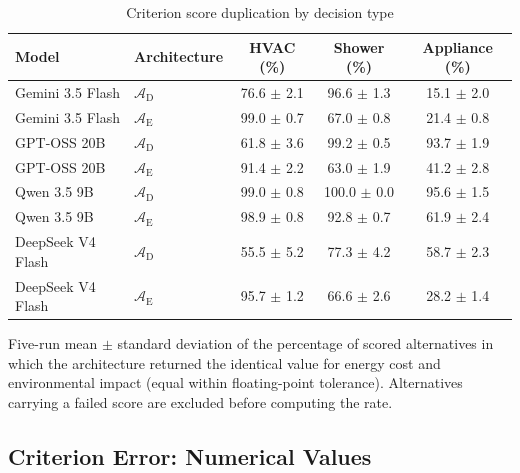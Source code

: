 \documentclass[11pt]{article}
\begin{document}
\begin{table}[htbp]
\centering
\begin{threeparttable}
  \centering
  \footnotesize
  \begin{tabular}{llccc}
    \toprule
    Model & Architecture & HVAC (\%) & Shower (\%) & Appliance (\%) \\
    \midrule
    Gemini 3.5 Flash & $\mathcal{A}_{\text{D}}$ & 76.6 $\pm$ 2.1 & 96.6 $\pm$ 1.3 & 15.1 $\pm$ 2.0 \\
    \addlinespace
    Gemini 3.5 Flash & $\mathcal{A}_{\text{E}}$ & 99.0 $\pm$ 0.7 & 67.0 $\pm$ 0.8 & 21.4 $\pm$ 0.8 \\
    GPT-OSS 20B & $\mathcal{A}_{\text{D}}$ & 61.8 $\pm$ 3.6 & 99.2 $\pm$ 0.5 & 93.7 $\pm$ 1.9 \\
    \addlinespace
    GPT-OSS 20B & $\mathcal{A}_{\text{E}}$ & 91.4 $\pm$ 2.2 & 63.0 $\pm$ 1.9 & 41.2 $\pm$ 2.8 \\
    Qwen 3.5 9B & $\mathcal{A}_{\text{D}}$ & 99.0 $\pm$ 0.8 & 100.0 $\pm$ 0.0 & 95.6 $\pm$ 1.5 \\
    \addlinespace
    Qwen 3.5 9B & $\mathcal{A}_{\text{E}}$ & 98.9 $\pm$ 0.8 & 92.8 $\pm$ 0.7 & 61.9 $\pm$ 2.4 \\
    DeepSeek V4 Flash & $\mathcal{A}_{\text{D}}$ & 55.5 $\pm$ 5.2 & 77.3 $\pm$ 4.2 & 58.7 $\pm$ 2.3 \\
    \addlinespace
    DeepSeek V4 Flash & $\mathcal{A}_{\text{E}}$ & 95.7 $\pm$ 1.2 & 66.6 $\pm$ 2.6 & 28.2 $\pm$ 1.4 \\
    \bottomrule
  \end{tabular}
  \begin{tablenotes}
    \item Five-run mean $\pm$ standard deviation of the percentage of scored
    alternatives in which the architecture returned the identical value for
    energy cost and environmental impact (equal within floating-point tolerance).
    Alternatives carrying a failed score are excluded before computing the rate.
  \end{tablenotes}
\end{threeparttable}
\caption{Criterion score duplication by decision type}
\label{tab:score_duplication}
\end{table}

\subsection{Criterion Error: Numerical Values}
\label{app:criterion_mae}
\end{document}
